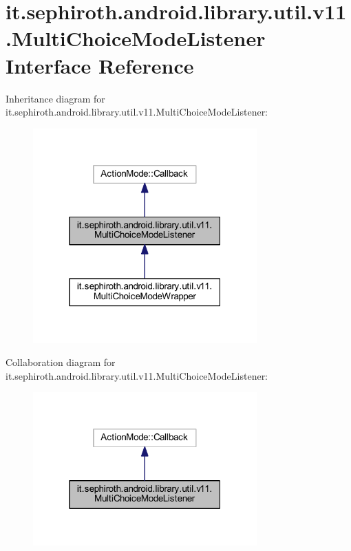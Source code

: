 \hypertarget{interfaceit_1_1sephiroth_1_1android_1_1library_1_1util_1_1v11_1_1_multi_choice_mode_listener}{}\section{it.\+sephiroth.\+android.\+library.\+util.\+v11.\+Multi\+Choice\+Mode\+Listener Interface Reference}
\label{interfaceit_1_1sephiroth_1_1android_1_1library_1_1util_1_1v11_1_1_multi_choice_mode_listener}


Inheritance diagram for it.\+sephiroth.\+android.\+library.\+util.\+v11.\+Multi\+Choice\+Mode\+Listener\+:
\nopagebreak
\begin{figure}[H]
\begin{center}
\leavevmode
\includegraphics[width=244pt]{interfaceit_1_1sephiroth_1_1android_1_1library_1_1util_1_1v11_1_1_multi_choice_mode_listener__inherit__graph}
\end{center}
\end{figure}


Collaboration diagram for it.\+sephiroth.\+android.\+library.\+util.\+v11.\+Multi\+Choice\+Mode\+Listener\+:
\nopagebreak
\begin{figure}[H]
\begin{center}
\leavevmode
\includegraphics[width=244pt]{interfaceit_1_1sephiroth_1_1android_1_1library_1_1util_1_1v11_1_1_multi_choice_mode_listener__coll__graph}
\end{center}
\end{figure}
